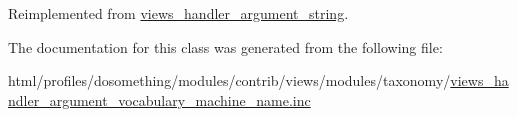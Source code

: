 Reimplemented from \hyperlink{classviews__handler__argument__string_abd176c527d765826b51c50346309b545}{views\_\-handler\_\-argument\_\-string}.

The documentation for this class was generated from the following file:\begin{DoxyCompactItemize}
\item 
html/profiles/dosomething/modules/contrib/views/modules/taxonomy/\hyperlink{views__handler__argument__vocabulary__machine__name_8inc}{views\_\-handler\_\-argument\_\-vocabulary\_\-machine\_\-name.inc}\end{DoxyCompactItemize}
